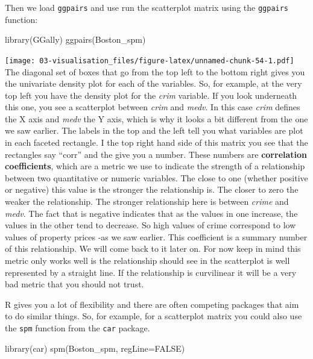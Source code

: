 \documentclass[
]{book}
\newenvironment{Shaded}{\begin{snugshade}}{\end{snugshade}}
\newcommand{\AttributeTok}[1]{\textcolor[rgb]{0.77,0.63,0.00}{#1}}
\newcommand{\ConstantTok}[1]{\textcolor[rgb]{0.00,0.00,0.00}{#1}}
\newcommand{\FunctionTok}[1]{\textcolor[rgb]{0.00,0.00,0.00}{#1}}
\newcommand{\NormalTok}[1]{#1}
\begin{document}
Then we load \texttt{ggpairs} and use run the scatterplot matrix using the \texttt{ggpairs} function:

\begin{Shaded}
\begin{Highlighting}[]
\FunctionTok{library}\NormalTok{(GGally)}
\FunctionTok{ggpairs}\NormalTok{(Boston\_spm)}
\end{Highlighting}
\end{Shaded}

\texttt{[image: 03-visualisation\_files/figure-latex/unnamed-chunk-54-1.pdf]}
The diagonal set of boxes that go from the top left to the bottom right gives you the univariate density plot for each of the variables. So, for example, at the very top left you have the density plot for the \emph{crim} variable. If you look underneath this one, you see a scatterplot between \emph{crim} and \emph{medv}. In this case \emph{crim} defines the X axis and \emph{medv} the Y axis, which is why it looks a bit different from the one we saw earlier. The labels in the top and the left tell you what variables are plot in each faceted rectangle. I the top right hand side of this matrix you see that the rectangles say ``corr'' and the give you a number. These numbers are \textbf{correlation coefficients}, which are a metric we use to indicate the strength of a relationship between two quantitative or numeric variables. The close to one (whether positive or negative) this value is the stronger the relationship is. The closer to zero the weaker the relationship. The stronger relationship here is between \emph{crime} and \emph{medv}. The fact that is negative indicates that as the values in one increase, the values in the other tend to decrease. So high values of crime correspond to low values of property prices -as we saw earlier. This coefficient is a summary number of this relationship. We will come back to it later on. For now keep in mind this metric only works well is the relationship should see in the scatterplot is well represented by a straight line. If the relationship is curvilinear it will be a very bad metric that you should not trust.

R gives you a lot of flexibility and there are often competing packages that aim to do similar things. So, for example, for a scatterplot matrix you could also use the \texttt{spm} function from the \texttt{car} package.

\begin{Shaded}
\begin{Highlighting}[]
\FunctionTok{library}\NormalTok{(car)}
\FunctionTok{spm}\NormalTok{(Boston\_spm, }\AttributeTok{regLine=}\ConstantTok{FALSE}\NormalTok{)}
\end{Highlighting}
\end{Shaded}
\end{document}

